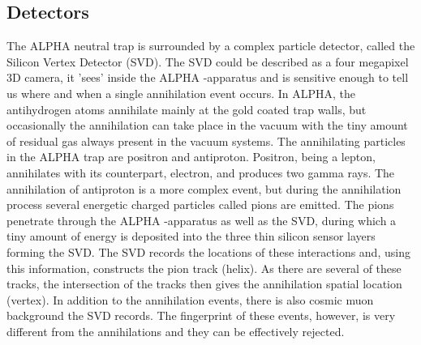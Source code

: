 \documentclass{article}
\begin{document}
\subsection{Detectors}
The ALPHA neutral trap is surrounded by a complex particle detector, called the Silicon Vertex Detector (SVD). The SVD could be described as a four megapixel 3D camera, it 'sees' inside the ALPHA -apparatus and is sensitive enough to tell us where and when a single annihilation event occurs. In ALPHA, the antihydrogen atoms annihilate mainly at the gold coated trap walls, but occasionally the annihilation can take place in the vacuum with the tiny amount of residual gas always present in the vacuum systems. The annihilating particles in the ALPHA trap are positron and antiproton. Positron, being a lepton, annihilates with its counterpart, electron, and produces two gamma rays. The annihilation of antiproton is a more complex event, but during the annihilation process several energetic charged particles called pions are emitted. The pions penetrate through the ALPHA -apparatus as well as the SVD, during which a tiny amount of energy is deposited into the three thin silicon sensor layers forming the SVD. The SVD records the locations of these interactions and, using this information, constructs the pion track (helix). As there are several of these tracks, the intersection of the tracks then gives the annihilation spatial location (vertex). In addition to the annihilation events, there is also cosmic muon background the SVD records. The fingerprint of these events, however, is very different from the annihilations and they can be effectively rejected.
\end{document}
